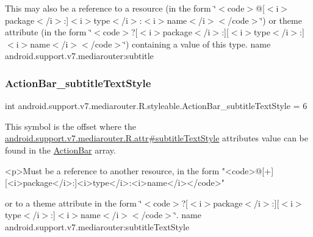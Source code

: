 This may also be a reference to a resource (in the form \char`\"{}$<$code$>$@\mbox{[}$<$i$>$package$<$/i$>$\+:\mbox{]}$<$i$>$type$<$/i$>$\+:$<$i$>$name$<$/i$>$$<$/code$>$\char`\"{}) or theme attribute (in the form \char`\"{}$<$code$>$?\mbox{[}$<$i$>$package$<$/i$>$\+:\mbox{]}\mbox{[}$<$i$>$type$<$/i$>$\+:\mbox{]}$<$i$>$name$<$/i$>$$<$/code$>$\char`\"{}) containing a value of this type.  name android.\+support.\+v7.\+mediarouter\+:subtitle \mbox{\label{classandroid_1_1support_1_1v7_1_1mediarouter_1_1R_1_1styleable_ade41aba152cb6a37bb56550851f0ebe0}} 
\subsubsection{\texorpdfstring{Action\+Bar\+\_\+subtitle\+Text\+Style}{ActionBar\_subtitleTextStyle}}
{\footnotesize\ttfamily int android.\+support.\+v7.\+mediarouter.\+R.\+styleable.\+Action\+Bar\+\_\+subtitle\+Text\+Style = 6\hspace{0.3cm}{\ttfamily [static]}}

This symbol is the offset where the \hyperlink{classandroid_1_1support_1_1v7_1_1mediarouter_1_1R_1_1attr_a44538ca09d79d732baf7e183450e704c}{android.\+support.\+v7.\+mediarouter.\+R.\+attr\#subtitle\+Text\+Style} attribute\textquotesingle{}s value can be found in the \hyperlink{classandroid_1_1support_1_1v7_1_1mediarouter_1_1R_1_1styleable_adc4d3c0d096085367f12d025007aa53f}{Action\+Bar} array.

\begin{DoxyVerb}      <p>Must be a reference to another resource, in the form "<code>@[+][<i>package</i>:]<i>type</i>:<i>name</i></code>"
\end{DoxyVerb}
 or to a theme attribute in the form \char`\"{}$<$code$>$?\mbox{[}$<$i$>$package$<$/i$>$\+:\mbox{]}\mbox{[}$<$i$>$type$<$/i$>$\+:\mbox{]}$<$i$>$name$<$/i$>$$<$/code$>$\char`\"{}.  name android.\+support.\+v7.\+mediarouter\+:subtitle\+Text\+Style \mbox{\label{classandroid_1_1support_1_1v7_1_1mediarouter_1_1R_1_1styleable_afe5e967b4606e60a2f7e266e1c18ca16}} 
